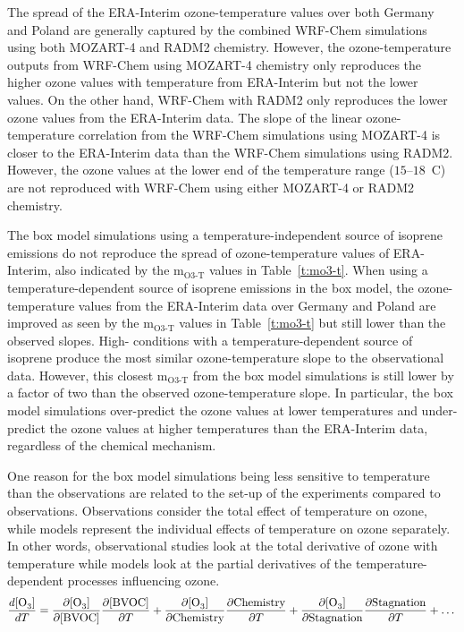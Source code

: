 The spread of the ERA-Interim ozone-temperature values over both Germany and Poland are generally captured by the combined WRF-Chem simulations using both MOZART-4 and RADM2 chemistry. 
However, the ozone-temperature outputs from WRF-Chem using MOZART-4 chemistry only reproduces the higher ozone values with temperature from ERA-Interim but not the lower values.
On the other hand, WRF-Chem with RADM2 only reproduces the lower ozone values from the ERA-Interim data.
The slope of the linear ozone-temperature correlation from the WRF-Chem simulations using MOZART-4 is closer to the ERA-Interim data than the WRF-Chem simulations using RADM2.
However, the ozone values at the lower end of the temperature range ($15$--$18$~\degree C) are not reproduced with WRF-Chem using either MOZART-4 or RADM2 chemistry.

The box model simulations using a temperature-independent source of isoprene emissions do not reproduce the spread of ozone-temperature values of ERA-Interim, also indicated by the m$_{\text{O3-T}}$ values in Table~\ref{t:mo3-t}.
When using a temperature-dependent source of isoprene emissions in the box model, the ozone-temperature values from the ERA-Interim data over Germany and Poland are improved as seen by the m$_{\text{O3-T}}$ values in Table~\ref{t:mo3-t} but still lower than the observed slopes.
High- conditions with a temperature-dependent source of isoprene produce the most similar ozone-temperature slope to the observational data.
However, this closest m$_{\text{O3-T}}$ from the box model simulations is still lower by a factor of two than the observed ozone-temperature slope.
In particular, the box model simulations over-predict the ozone values at lower temperatures and under-predict the ozone values at higher temperatures than the ERA-Interim data, regardless of the chemical mechanism.

One reason for the box model simulations being less sensitive to temperature than the observations are related to the set-up of the experiments compared to observations.
Observations consider the total effect of temperature on ozone, while models represent the individual effects of temperature on ozone separately. 
In other words, observational studies look at the total derivative of ozone with temperature while models look at the partial derivatives of the temperature-dependent processes influencing ozone. 
\begin{equation*} 
    \frac{d[\ce{O3}]}{dT} = \frac{\partial [\ce{O3}]}{\partial [\text{BVOC}]}\frac{\partial [\text{BVOC}]}{\partial T} + \frac{\partial [\ce{O3}]}{\partial \text{Chemistry}}\frac{\partial \text{Chemistry}}{\partial T} + \frac{\partial [\ce{O3}]}{\partial \text{Stagnation}}\frac{\partial \text{Stagnation}}{\partial T} + \dots
\end{equation*}

